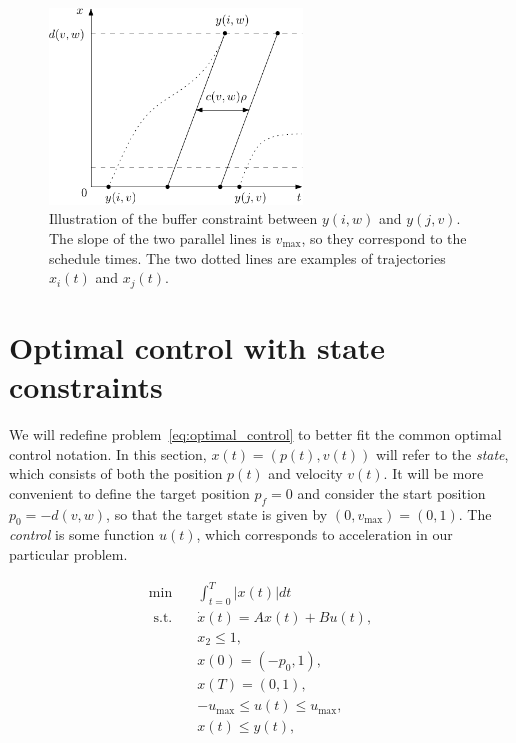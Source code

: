 \documentclass[a4paper]{article}
\theoremstyle{definition}
\theoremstyle{plain}
\begin{document}
\begin{figure}[h]
  \centering
  \includegraphics[width=0.6\textwidth]{figures/capacity_constraint.pdf}
  \caption{Illustration of the buffer constraint between $y(i, w)$ and
    $y(j, v)$. The slope of the two parallel lines is $v_{\max}$, so they
    correspond to the schedule times. The two dotted lines are examples of
    trajectories $x_{i}(t)$ and $x_{j}(t)$.}
  \label{fig:buffer-constraint}
\end{figure}


\newpage

\section{Optimal control with state constraints}

We will redefine problem~\eqref{eq:optimal_control} to better fit the common
optimal control notation. In this section, $x(t) = (p(t), v(t))$ will refer to
the \textit{state}, which consists of both the position $p(t)$ and velocity
$v(t)$. It will be more convenient to define the target position $p_{f} = 0$ and
consider the start position $p_{0} = - d(v, w)$, so that the target state is
given by $(0, v_{\max}) = (0, 1)$. The \textit{control} is some function $u(t)$,
which corresponds to acceleration in our particular problem.

\begin{subequations}
\begin{align}
  \min \quad & \int_{t=0}^{T} |x(t)| dt \\
  \text{ s.t. } \;\, & \dot{x}(t) = Ax(t) + Bu(t) , \\
                     & x_{2} \leq 1 , \\
                & x(0) = (-p_{0}, 1) , \\
                & x(T) = (0, 1) , \\
                & {-u_{\max}} \leq u(t) \leq u_{\max} , \\
                & x(t) \leq y(t) ,
\end{align}
\end{subequations}
\end{document}
